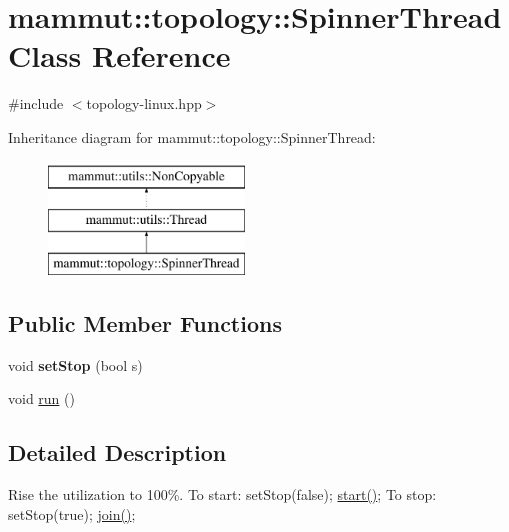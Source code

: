 \hypertarget{classmammut_1_1topology_1_1SpinnerThread}{\section{mammut\-:\-:topology\-:\-:Spinner\-Thread Class Reference}
\label{classmammut_1_1topology_1_1SpinnerThread}
}


{\ttfamily \#include $<$topology-\/linux.\-hpp$>$}

Inheritance diagram for mammut\-:\-:topology\-:\-:Spinner\-Thread\-:\begin{figure}[H]
\begin{center}
\leavevmode
\includegraphics[height=3.000000cm]{classmammut_1_1topology_1_1SpinnerThread}
\end{center}
\end{figure}
\subsection*{Public Member Functions}
\begin{DoxyCompactItemize}
\item 
\hypertarget{classmammut_1_1topology_1_1SpinnerThread_a7a34eede0034fa73e1dc4cdb4ec6a47a}{void {\bfseries set\-Stop} (bool s)}\label{classmammut_1_1topology_1_1SpinnerThread_a7a34eede0034fa73e1dc4cdb4ec6a47a}

\item 
void \hyperlink{classmammut_1_1topology_1_1SpinnerThread_ab13fed916eab76656a92ee38b85ad6c6}{run} ()
\end{DoxyCompactItemize}


\subsection{Detailed Description}
Rise the utilization to 100\%. To start\-: set\-Stop(false); \hyperlink{classmammut_1_1utils_1_1Thread_a7c09cabe54b1626a574eca403d3f569c}{start()}; To stop\-: set\-Stop(true); \hyperlink{classmammut_1_1utils_1_1Thread_a5d5f68a806285803e815debc6dd0f278}{join()}; 

